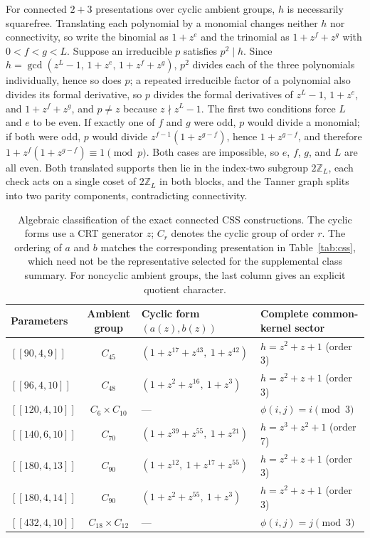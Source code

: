 \documentclass[aps,prx,twocolumn,superscriptaddress,nofootinbib,floatfix]{revtex4-2}
\newcommand{\code}[1]{\ensuremath{\left[\!\left[#1\right]\!\right]}}
\begin{document}
For connected $2+3$ presentations over cyclic ambient groups, $h$ is
necessarily squarefree.  Translating each polynomial by a monomial changes
neither $h$ nor connectivity, so write the binomial as $1+z^e$ and the
trinomial as $1+z^f+z^g$ with $0<f<g<L$.  Suppose an irreducible $p$ satisfies
$p^2\mid h$.  Since $h=\gcd(z^L-1,\,1+z^e,\,1+z^f+z^g)$, $p^2$ divides each of
the three polynomials individually, hence so does $p$; a repeated
irreducible factor of a polynomial also divides its formal derivative, so $p$
divides the formal derivatives of $z^L-1$, $1+z^e$, and $1+z^f+z^g$, and
$p\neq z$ because $z\nmid z^L-1$.  The first two conditions force $L$ and $e$
to be even.  If exactly one of $f$ and
$g$ were odd, $p$ would divide a monomial; if both were odd, $p$ would divide
$z^{f-1}(1+z^{g-f})$, hence $1+z^{g-f}$, and therefore
$1+z^f(1+z^{g-f})\equiv1\pmod p$.  Both cases are impossible, so $e$, $f$,
$g$, and $L$ are all even.  Both translated supports then lie in the
index-two subgroup $2\mathbb Z_L$, each check acts on a single coset of
$2\mathbb Z_L$ in both blocks, and the Tanner graph splits into two parity
components, contradicting connectivity.

\begin{table}[t]
\centering
\caption{Algebraic classification of the exact connected CSS constructions.
The cyclic forms use a CRT generator $z$; $C_r$ denotes the cyclic group of
order $r$.  The ordering of $a$ and $b$ matches
the corresponding presentation in Table~\ref{tab:css}, which need not be the
representative selected for the supplemental class summary.  For
noncyclic ambient groups, the last column gives an explicit quotient character.}
\label{tab:algebraic}
\scriptsize
\setlength{\tabcolsep}{4pt}
\begin{tabular}{lcll}
\toprule
Parameters & Ambient group & Cyclic form $(a(z),b(z))$ & Complete common-kernel sector\\
\midrule
$\code{90,4,9}$ & $C_{45}$ & $(1+z^{17}+z^{43},\ 1+z^{42})$ & $h=z^2+z+1$ (order 3)\\
$\code{96,4,10}$ & $C_{48}$ & $(1+z^2+z^{16},\ 1+z^3)$ & $h=z^2+z+1$ (order 3)\\
$\code{120,4,10}$ & $C_6\times C_{10}$ & --- & $\phi(i,j)=i\pmod 3$\\
$\code{140,6,10}$ & $C_{70}$ & $(1+z^{39}+z^{55},\ 1+z^{21})$ & $h=z^3+z^2+1$ (order 7)\\
$\code{180,4,13}$ & $C_{90}$ & $(1+z^{12},\ 1+z^{17}+z^{55})$ & $h=z^2+z+1$ (order 3)\\
$\code{180,4,14}$ & $C_{90}$ & $(1+z^2+z^{55},\ 1+z^3)$ & $h=z^2+z+1$ (order 3)\\
$\code{432,4,10}$ & $C_{18}\times C_{12}$ & --- & $\phi(i,j)=j\pmod 3$\\
\bottomrule
\end{tabular}
\end{table}
\end{document}
